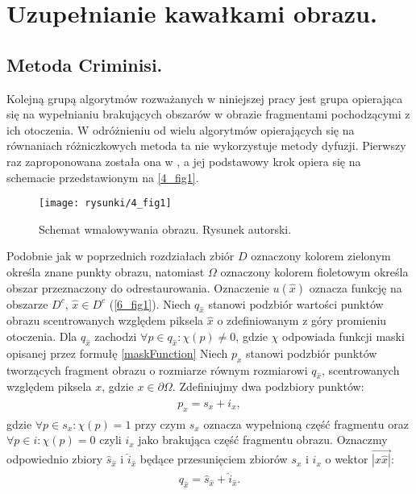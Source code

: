 \documentclass[12pt, twoside, openany]{report}
\theoremstyle{definition}
\begin{document}
\chapter{Uzupełnianie kawałkami obrazu.}
\section{Metoda Criminisi.}
\label{sec:crimMetod}
Kolejną grupą algorytmów rozważanych w niniejszej pracy jest grupa opierająca się na wypełnianiu brakujących obszarów w obrazie fragmentami pochodzącymi z ich otoczenia. W odróżnieniu od wielu algorytmów opierających się na równaniach różniczkowych metoda ta nie wykorzystuje metody dyfuzji. Pierwszy raz zaproponowana została ona w \cite{efros1999texture}, a jej podstawowy krok opiera się na schemacie przedstawionym na \autoref{4_fig1}.
\begin{figure}[!h]
	\centering
	\texttt{[image: rysunki/4\_fig1]}
	\caption{Schemat wmalowywania obrazu. Rysunek autorski.}
	\label{4_fig1}
\end{figure}
Podobnie jak w poprzednich rozdziałach zbiór $D$ oznaczony kolorem zielonym
określa znane punkty obrazu, natomiast $\Omega$ oznaczony kolorem fioletowym określa obszar przeznaczony do odrestaurowania.
Oznaczenie $u(\hat{x})$ oznacza funkcję na obszarze $D^c$, $\hat{x}  \in D^c$ (\autoref{6_fig1}).
Niech $q_{\hat{x}}$ stanowi podzbiór wartości punktów obrazu scentrowanych względem piksela $\hat{x}$ o zdefiniowanym z góry promieniu otoczenia.
Dla $q_{\hat{x}}$ zachodzi $\forall p \in q_{\hat{x}} : \chi(p) \neq 0$, gdzie $\chi$ odpowiada funkcji maski opisanej przez formułę \eqref{maskFunction} 
Niech $p_{x}$ stanowi podzbiór punktów tworzących fragment obrazu o rozmiarze równym rozmiarowi $q_{\hat{x}}$, scentrowanych względem piksela $x$, gdzie $x \in \partial \Omega$.
Zdefiniujmy dwa podzbiory punktów:
\begin{align}
\begin{aligned}
p_{x} = s_x + i_x,
\end{aligned}
\end{align}
gdzie $\forall p \in s_x : \chi(p) = 1$ przy czym $s_x$ oznacza wypełnioną część fragmentu oraz $\forall p \in i : \chi(p) = 0$ czyli $i_x$ jako brakująca część fragmentu obrazu.  
Oznaczmy odpowiednio zbiory $\hat{s}_{\hat{x}}$ i $\hat{i}_{\hat{x}}$ będące przesunięciem zbiorów $s_x$ i $i_x$ o wektor $\overrightarrow{|x \hat{x}|}$:
\begin{align}
\begin{aligned}
q_{\hat{x}} = \hat{s}_{\hat{x}} + \hat{i}_{\hat{x}}.
\end{aligned}
\end{align}
\end{document}
